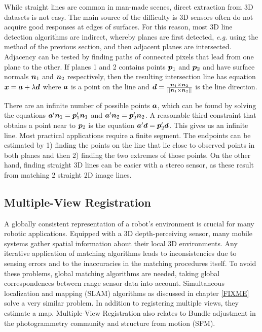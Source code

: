 \documentclass[twocolumn,oneside]{book}
\newcommand{\V}[1]{\vector{#1}}  %
\begin{document}
\begin{itemize}
  While straight lines are common in man-made scenes, direct
  extraction from 3D datasets is not easy.  The main source of the
  difficulty is 3D sensors often do not acquire good responses at
  edges of surfaces.
%
  For this reason, most 3D line detection algorithms are indirect,
  whereby planes are first detected, {\it e.g.} using the method of
  the previous section, and then adjacent planes are intersected.
  Adjacency can be tested by finding paths of connected pixels that
  lead from one plane to the other.
%
  If planes 1 and 2 contains points $\V p_1$ and $\V p_2$ and have
  surface normals $\V n_1$ and $\V n_2$ respectively, then the
  resulting intersection line has equation $\V x = \V a + \lambda \V
  d$ where $\V a$ is a point on the line and $\V d = \frac{\V n_1
    \times \V n_2} {\mid\mid \V n_1 \times \V n_2 \mid\mid}$ is the
  line direction.

  There are an infinite number of possible points $\V a$, which can be
  found by solving the equations $\V a' \V n_1 = \V p_1' \V n_1$ and
  $\V a' \V n_2 = \V p_2'\V n_2$. A reasonable third constraint that
  obtains a point near to $\V p_2$ is the equation $\V a' \V d = \V
  p_2' \V d$. This gives us an infinite line. Most practical
  applications require a finite segment. The endpoints can be
  estimated by 1) finding the points on the line that lie close to
  observed points in both planes and then 2) finding the two extremes
  of those points.  On the other hand, finding straight 3D lines can
  be easier with a stereo sensor, as these result from matching 2
  straight 2D image lines.

\end{itemize}

\subsection{Multiple-View Registration\label{match31}}

A globally consistent representation of a robot's environment is
crucial for many robotic applications. Equipped with a 3D
depth-perceiving sensor, many mobile systems gather spatial
information about their local 3D environments. Any iterative
application of matching algorithms leads to inconsistencies due to
sensing errors and to the inaccuracies in the matching procedures
itself. To avoid these problems, global matching algorithms are
needed, taking global correspondences between range sensor data into
account. Simultaneous localization and mapping (SLAM) algorithms as
discussed in chapter \ref{FIXME} solve a very similar problem. In
addition to registering multiple views, they estimate a map.
Multiple-View Registration also relates to Bundle adjustment in the
photogrammetry community and structure from motion (SFM).
\end{document}
